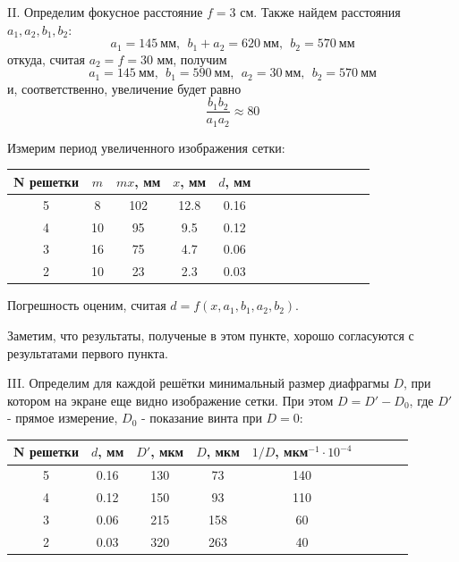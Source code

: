 \documentclass[14pt]{article}
\begin{document}
\vspace{1cm}
II. Определим фокусное расстояние $f = 3$ см. Также найдем расстояния $a_1, a_2, b_1, b_2$:
$$
	a_1 = 145~\text{мм},~~b_1+a_2 = 620~\text{мм},~~b_2 = 570~\text{мм}
$$
\noindent откуда, считая $a_2 = f = 30$ мм, получим
$$
	a_1 = 145~\text{мм},~~b_1 = 590~\text{мм},~~a_2 = 30~\text{мм},~~b_2 = 570~\text{мм}
$$
\noindent и, соответственно, увеличение будет равно
$$
	\frac{b_1b_2}{a_1a_2} \approx 80
$$

Измерим период увеличенного изображения сетки:

\begin{center}
\begin{tabular}{|c|c|c|c|c|c|c|c|c|c|c|c|c|c|}
\hline
N решетки	&	$m$		&	$mx$, мм	&	$x$, мм	&	$d$, мм	\\
\hline
5			&	8		&	102			&	12.8	&	0.16	\\
\hline
4			&	10		&	95			&	9.5		&	0.12	\\
\hline
3			&	16		&	75			&	4.7		&	0.06	\\
\hline
2			&	10		&	23			&	2.3		&	0.03	\\
\hline
\end{tabular}
\end{center}

Погрешность оценим, считая $d = f(x, a_1, b_1, a_2, b_2)$.

Заметим, что результаты, полученые в этом пункте, хорошо согласуются с результатами первого пункта.

\vspace{1cm}
III. Определим для каждой решётки минимальный размер диафрагмы $D$, при котором на экране еще видно изображение сетки. При этом $D = D' - D_0$, где $D'$ - прямое измерение, $D_0$ - показание винта при $D = 0$:

\begin{center}
\begin{tabular}{|c|c|c|c|c|c|c|c|c|}
\hline
N решетки	&	$d$, мм	&	$D'$, мкм	&	$D$, мкм	&	$1/D$, мкм$^{-1}\cdot 10^{-4}$	\\
\hline
5			&	0.16	&	130			&	73			&	140								\\
\hline
4			&	0.12	&	150			&	93			&	110								\\
\hline
3			&	0.06	&	215			&	158			&	60								\\
\hline
2			&	0.03	&	320			&	263 		&	40								\\
\hline
\end{tabular}
\end{center}
\end{document}
